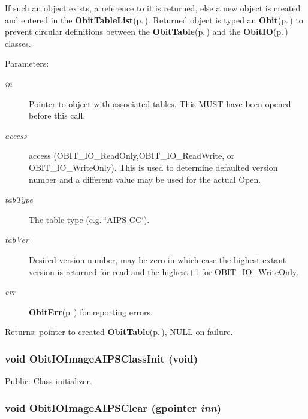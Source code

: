 If such an object exists, a reference to it is returned, else a new object is created and entered in the {\bf Obit\-Table\-List}{\rm (p.\,\pageref{structObitTableList})}. Returned object is typed an {\bf Obit}{\rm (p.\,\pageref{structObit})} to prevent circular definitions between the {\bf Obit\-Table}{\rm (p.\,\pageref{structObitTable})} and the {\bf Obit\-IO}{\rm (p.\,\pageref{structObitIO})} classes. \begin{Desc}
\item[Parameters:]
\begin{description}
\item[{\em in}]Pointer to object with associated tables. This MUST have been opened before this call. \item[{\em access}]access (OBIT\_\-IO\_\-Read\-Only,OBIT\_\-IO\_\-Read\-Write, or OBIT\_\-IO\_\-Write\-Only). This is used to determine defaulted version number and a different value may be used for the actual Open. \item[{\em tab\-Type}]The table type (e.g. \char`\"{}AIPS CC\char`\"{}). \item[{\em tab\-Ver}]Desired version number, may be zero in which case the highest extant version is returned for read and the highest+1 for OBIT\_\-IO\_\-Write\-Only. \item[{\em err}]{\bf Obit\-Err}{\rm (p.\,\pageref{structObitErr})} for reporting errors. \end{description}
\end{Desc}
\begin{Desc}
\item[Returns:]pointer to created {\bf Obit\-Table}{\rm (p.\,\pageref{structObitTable})}, NULL on failure. \end{Desc}
\subsubsection{\setlength{\rightskip}{0pt plus 5cm}void Obit\-IOImage\-AIPSClass\-Init (void)}\label{ObitIOImageAIPS_8c_a24}


Public: Class initializer. 

\subsubsection{\setlength{\rightskip}{0pt plus 5cm}void Obit\-IOImage\-AIPSClear (gpointer {\em inn})}\label{ObitIOImageAIPS_8c_a4}


